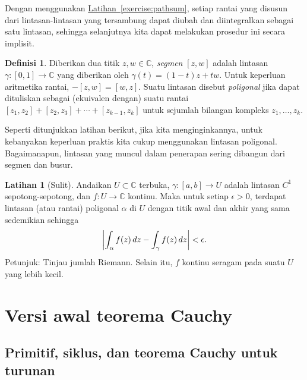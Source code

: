 \documentclass[12pt,openany]{book}
\newcommand{\avoidbreak}{\postdisplaypenalty=100}
\newcommand{\abs}[1]{\left\lvert {#1} \right\rvert}
\newcommand{\C}{{\mathbb{C}}}
\newcommand{\myindex}[1]{#1\index{#1}}
\theoremstyle{plain}
\theoremstyle{remark}
\theoremstyle{definition}
\newtheorem{defn}[thm]{Definisi}
\newenvironment{exbox}{%
    \def\FrameCommand{\vrule width 1pt \relax\hspace{10pt}}%
    \MakeFramed{\advance\hsize-\width\FrameRestore}%
}{%
    \endMakeFramed
}
\theoremstyle{exercise}
\newtheorem{exercise}{Latihan}[section]
\theoremstyle{example}
\newcommand{\exerciseref}[1]{\hyperref[#1]{Latihan~\ref*{#1}}}
\begin{document}
Dengan menggunakan \exerciseref{exercise:pathsum},
setiap rantai yang disusun
dari lintasan-lintasan yang tersambung dapat diubah dan diintegralkan sebagai satu lintasan,
sehingga selanjutnya kita dapat melakukan prosedur ini secara implisit.

\begin{defn}
\pagebreak[2]
%
Diberikan dua titik $z,w \in \C$, \emph{\myindex{segmen}} $[z,w]$ adalah lintasan
$\gamma \colon [0,1] \to \C$ yang diberikan oleh $\gamma(t) = (1-t)z + tw$.
Untuk keperluan aritmetika rantai, $-[z,w] = [w,z]$.
Suatu lintasan disebut \emph{\myindex{poligonal}} jika dapat dituliskan sebagai
(ekuivalen dengan) suatu rantai
$[z_1,z_2] + [z_2,z_3] + \cdots + [z_{k-1},z_k]$ untuk sejumlah bilangan kompleks
$z_1,\ldots,z_k$.
\end{defn}

Seperti ditunjukkan latihan berikut, jika kita menginginkannya, untuk kebanyakan keperluan praktis
kita cukup menggunakan lintasan poligonal.
Bagaimanapun, lintasan yang muncul dalam penerapan sering dibangun dari
segmen dan busur.

\begin{exbox}
\begin{exercise}[Sulit]
Andaikan $U \subset \C$ terbuka, $\gamma \colon [a,b] \to U$ adalah
lintasan $C^1$ sepotong-sepotong, dan $f \colon U \to \C$ kontinu.  Maka untuk setiap $\epsilon
> 0$, terdapat lintasan (atau rantai) poligonal $\alpha$ di $U$ dengan titik
awal dan akhir yang sama sedemikian sehingga
\begin{equation*}
\abs{\int_\alpha f(z)\, dz - \int_{\gamma} f(z) \, dz} < \epsilon .
\avoidbreak
\end{equation*}
Petunjuk: Tinjau jumlah Riemann.  Selain itu, $f$ kontinu seragam pada suatu
$U$ yang lebih kecil.
\end{exercise}
\end{exbox}


\section{Versi awal teorema Cauchy}
\label{sec:simplecauchy}

\subsection{Primitif, siklus, dan teorema Cauchy untuk turunan}
\end{document}
